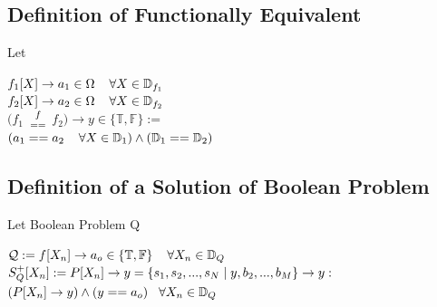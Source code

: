 \documentclass[11pt]{article}
\def \fequiv{{f} \atop{==}}
\begin{document}
\subsection{Definition of Functionally Equivalent}
Let
\begin{center}
$
f_{1}[X] \rightarrow a_1 \in \Omega \hspace{4mm} \forall X \in \mathbb{D}_{f_1} 
$
\\ \vspace{2mm}
$
f_{2}[X] \rightarrow a_2 \in \Omega \hspace{4mm} \forall X \in \mathbb{D}_{f_2} 
$
\\ \vspace{6mm}
$
(f_1$ $\fequiv$ $f_2) \rightarrow y \in \{\mathbb{T},\mathbb{F}\} :=
$
\\ \vspace{2mm}
$
(a_1 == a_2 \hspace{4mm} \forall X \in \mathbb{D}_1) \land (\mathbb{D}_1 == \mathbb{D}_2)
$
\end{center}




\subsection{Definition of a Solution of Boolean Problem}
Let Boolean Problem Q
\begin{center}
\vspace{1mm}
$
\mathcal{Q} := f\lbrack X_n \rbrack \rightarrow a_o \in \{\mathbb{T},\mathbb{F}\} \hspace{4mm} \forall X_n \in \mathbb{D}_{Q}
$
\\ \vspace{6mm}
$
S_Q^+[X_n] := P[X_n] \rightarrow y =\{ s_1,s_2,...,s_{N}\hspace{1mm}|\hspace{1mm} y, b_2,...,b_M\} \rightarrow y :
$
\\ \vspace{2mm}
$
(P[X_n] \rightarrow y) \land (y == a_o) \hspace{3mm} \forall  X_n \in \mathbb{D}_Q
$
\end{center}
\end{document}
